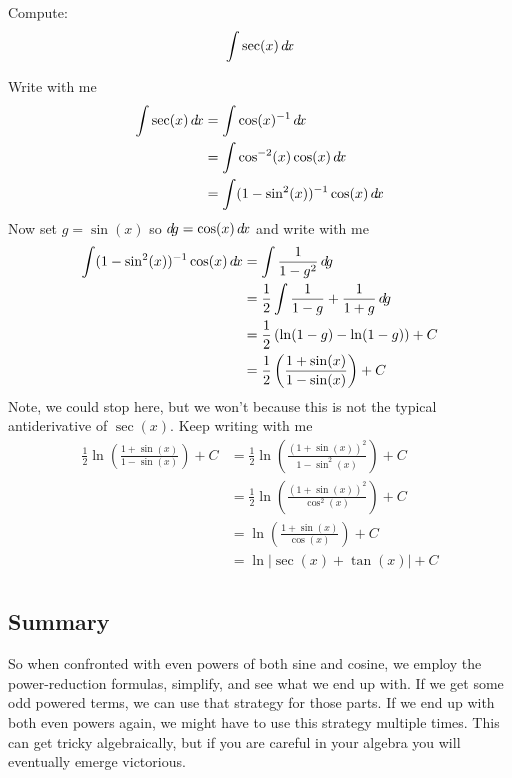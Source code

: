 \documentclass{ximera}
\begin{document}
\begin{example}
  Compute:
  \[
  \int \sec (x) \mathop{}\!d\! x
  \]
  \begin{explanation}
    Write with me
    \begin{align*}
      \int \sec(x) \d x &= \int \cos(x)^{-1} \d x\\
      &= \int \cos^{-2}(x)\cos(x) \d x\\
      &=\int(1-\sin^2(x))^{-1} \cos(x) \d x
    \end{align*}
    Now set $g =\sin(x)$ so $\mathop{}\!d\! g = \cos(x) \mathop{}\!d\! x$ and write with me
    \begin{align*}
      \int(1-\sin^2(x))^{-1} \cos(x) \mathop{}\!d\! x &= \int \frac{1}{1-g^2}\mathop{}\!d\! g\\
      &= \frac{1}{2}\int \frac{1}{1-g} + \frac{1}{1+g} \mathop{}\!d\! g\\
      &= \frac{1}{2}\left(\ln(1-g) - \ln(1-g)\right)+C\\
      &= \frac{1}{2}\left(\frac{1+\sin(x)}{1-\sin(x)}\right)+C
    \end{align*}
    Note, we could stop here, but we won't because this is not the
    typical antiderivative of $\sec(x)$. Keep writing with me
    \begin{align*}
      \frac{1}{2}\ln\left(\frac{1+\sin(x)}{1-\sin(x)}\right)+C &= \frac{1}{2}\ln\left(\frac{(1+\sin(x))^2}{1-\sin^2(x)}\right)+C \\
      &= \frac{1}{2}\ln\left(\frac{(1+\sin(x))^2}{\cos^2(x)}\right)+C \\
      &= \ln\left(\frac{1+\sin(x)}{\cos(x)}\right)+C \\
      &= \ln\left|\sec(x) + \tan(x)\right|+C \\
    \end{align*}
  \end{explanation}
\end{example}



\subsection{Summary}

So when confronted with even powers of both sine and cosine, we employ
the power-reduction formulas, simplify, and see what we end up with.
If we get some odd powered terms, we can use that strategy for those
parts.  If we end up with both even powers again, we might have to use
this strategy multiple times.  This can get tricky algebraically, but
if you are careful in your algebra you will eventually emerge
victorious.
\end{document}
